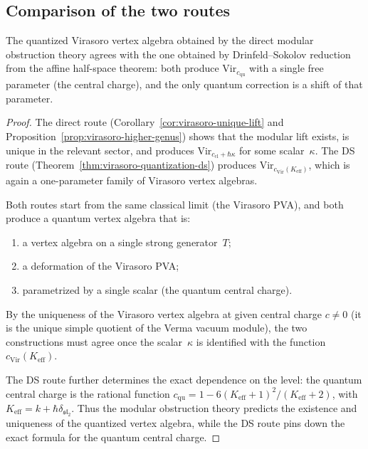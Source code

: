 \subsection{Comparison of the two routes}
\label{subsec:virasoro-comparison}

\begin{theorem}
\label{thm:virasoro-consistency}
The quantized Virasoro vertex algebra obtained by the direct modular
obstruction theory agrees with the one obtained by Drinfeld--Sokolov
reduction from the affine half-space theorem: both produce
$\mathrm{Vir}_{c_{\mathrm{qu}}}$ with a single free parameter
(the central charge), and the only quantum correction is a shift of that
parameter.
\end{theorem}

\begin{proof}
The direct route (Corollary~\ref{cor:virasoro-unique-lift} and
Proposition~\ref{prop:virasoro-higher-genus}) shows that the modular
lift exists, is unique in the relevant sector, and produces
$\mathrm{Vir}_{c_{\mathrm{cl}}+\hbar\kappa}$ for some scalar~$\kappa$.
The DS route (Theorem~\ref{thm:virasoro-quantization-ds}) produces
$\mathrm{Vir}_{c_{\mathrm{Vir}}(K_{\mathrm{eff}})}$, which is again a
one-parameter family of Virasoro vertex algebras.

Both routes start from the same classical limit (the Virasoro PVA), and
both produce a quantum vertex algebra that is:
\begin{enumerate}[leftmargin=2.4em]
\item a vertex algebra on a single strong generator~$T$;
\item a deformation of the Virasoro PVA;
\item parametrized by a single scalar (the quantum central charge).
\end{enumerate}
By the uniqueness of the Virasoro vertex algebra at given central charge
$c\neq 0$ (it is the unique simple quotient of the Verma vacuum module),
the two constructions must agree once the scalar~$\kappa$ is identified
with the function $c_{\mathrm{Vir}}(K_{\mathrm{eff}})$.

The DS route further determines the exact dependence on the level: the
quantum central charge is the rational function
$c_{\mathrm{qu}} = 1 - 6(K_{\mathrm{eff}}+1)^2/(K_{\mathrm{eff}}+2)$,
with $K_{\mathrm{eff}} = k + \hbar\delta_{\mathfrak{sl}_2}$. Thus
the modular obstruction theory predicts the existence and uniqueness
of the quantized vertex algebra, while the DS route pins down the exact
formula for the quantum central charge.
\end{proof}

